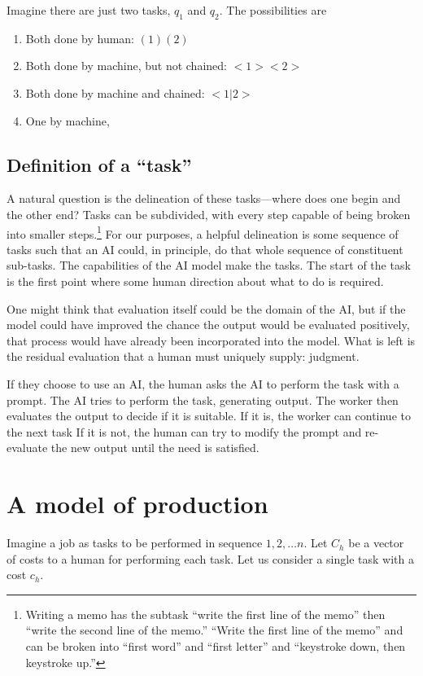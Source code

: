 \documentclass{article}
\begin{document}
Imagine there are just two tasks, $q_1$ and $q_2$.
The possibilities are
\begin{enumerate}
 \item Both done by human: $(1)(2)$
 \item Both done by machine, but not chained: $<1><2>$
  \item Both done by machine and chained: $<1|2>$
  \item One by machine, 

 
\end{enumerate}

\subsection{Definition of a ``task''}
A natural question is the delineation of these tasks---where does one begin and the other end? 
Tasks can be subdivided, with every step capable of being broken into smaller steps.\footnote{
    Writing a memo has the subtask ``write the first line of the memo'' then ``write the second line of the memo.''
    ``Write the first line of the memo'' and can be broken into ``first word'' and ``first letter'' and ``keystroke down, then keystroke up.''    
}
For our purposes, a helpful delineation is some sequence of tasks such that an AI could, in principle, do that whole sequence of constituent sub-tasks.
The capabilities of the AI model make the tasks. 
The start of the task is the first point where some human direction about what to do is required. 

One might think that evaluation itself could be the domain of the AI, but if the model could have improved the chance the output would be evaluated positively, that process would have already been incorporated into the model. 
What is left is the residual evaluation that a human must uniquely supply: judgment.

If they choose to use an AI, the human asks the AI to perform the task with a prompt. 
The AI tries to perform the task, generating output.
The worker then evaluates the output to decide if it is suitable. 
If it is, the worker can continue to the next task 
If it is not, the human can try to modify the prompt and re-evaluate the new output until the need is satisfied. 

\section{A model of production}
Imagine a job as tasks to be performed in sequence $1, 2, \ldots n$.
Let $C_h$ be a vector of costs to a human for performing each task.
Let us consider a single task with a cost $c_{h}$.
\end{document}
